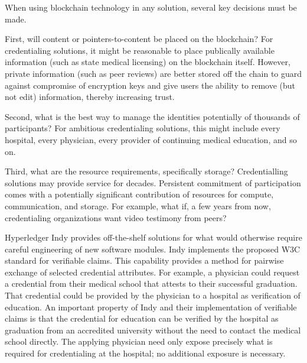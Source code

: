 When using blockchain technology in any solution, several key decisions must be made.

First, will content or pointers-to-content be placed on the blockchain?  For credentialing
solutions, it might be reasonable to place publically available information (such as state medical
licensing) on the blockchain itself.  However, private information (such as peer reviews) are better
stored off the chain to guard against compromise of encryption keys and give users the ability to
remove (but not edit) information, thereby increasing trust.

Second, what is the best way to manage the identities potentially of thousands of participants?  For
ambitious credentialing solutions, this might include every hospital, every physician, every
provider of continuing medical education, and so on.

Third, what are the resource requirements, specifically storage? Credentialling solutions may
provide service for decades. Persistent commitment of participation comes with a potentially
significant contribution of resources for compute, communication, and storage. For example, what if,
a few years from now, credentialing organizations want video testimony from peers?

Hyperledger Indy provides off-the-shelf solutions for what would otherwise require careful
engineering of new software modules. Indy implements the proposed W3C standard for verifiable
claims. This capability provides a method for pairwise exchange of selected credential
attributes. For example, a physician could request a credential from their medical school that
attests to their successful graduation. That credential could be provided by the physician to a
hospital as verification of education. An important property of Indy and their implementation of
verifiable claims is that the credential for education can be verified by the hospital as
graduation from an accredited university without the need to contact the medical school
directly. The applying physician need only expose precisely what is required for credentialing at
the hospital; no additional exposure is necessary.

